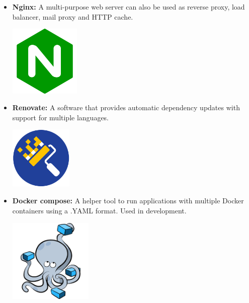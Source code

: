 \begin{itemize}
          \newpage
    \item \textbf{Nginx:} \newline \cite{nginx} A multi-purpose web server can also be used as reverse proxy, load balancer, mail proxy and HTTP cache. \newline
          \begin{minipage}{\linewidth}
              \centering
              \includegraphics[width=3.4cm]{src/assets/logos/nginx_512x512.png}
          \end{minipage}
    \item \textbf{Renovate:} \newline A software that provides automatic dependency updates with support for multiple languages. \newline
          \begin{minipage}{\linewidth}
              \centering
              \includegraphics[width=3cm]{src/assets/logos/renovate_200x200.png}
          \end{minipage}
    \item \textbf{Docker compose:} \newline A helper tool to run applications with multiple Docker containers using a .YAML format. Used in development. \newline
          \begin{minipage}{\linewidth}
              \centering
              \includegraphics[width=4cm]{src/assets/logos/docker-compose_667x667.png}
          \end{minipage}


\end{itemize}
